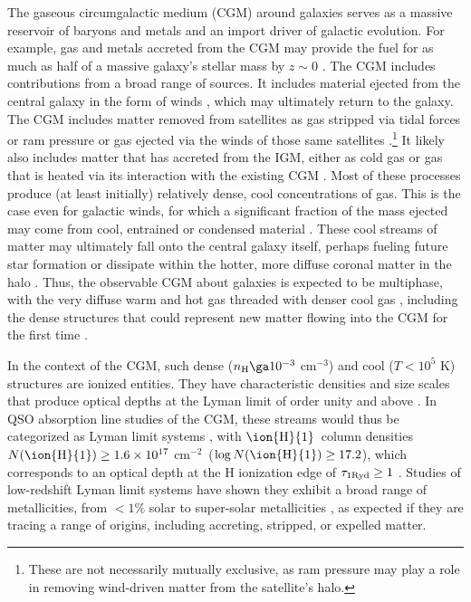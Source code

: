 \documentclass[12pt,preprint]{aastex6}
\newcommand{\HI}{\ensuremath{\mbox{\ion{H}{1}}}}
\newcommand{\logNHI}{\ensuremath{\log N(\mbox{\ion{H}{1}})}\relax}
\newcommand{\column}{cm$^{-2}$}
\newcommand{\percc}{cm$^{-3}$}
\begin{document}
The gaseous circumgalactic medium (CGM) around galaxies serves as a
massive reservoir of baryons and metals \citep{peeples2014, werk2014,
  keeney2017} and an import driver of galactic evolution. For example,
gas and metals accreted from the CGM may provide the fuel for as much
as half of a massive galaxy's stellar mass by $z\sim0$
\citep[e.g.,][]{oppenheimer2010, ford2014, angles-alcazar2016}. The
CGM includes contributions from a broad range of sources. It includes
material ejected from the central galaxy in the form of winds
\citep[e.g.,][]{weiner2009, tripp2011, shen2013, rubin2014, cafg2015,
  muratov2017}, which may ultimately return to the galaxy. The CGM
includes matter removed from satellites as gas stripped via tidal
forces or ram pressure \citep{grcevich2009, spekkens2014, emerick2016}
or gas ejected via the winds of those same satellites
\citep[e.g.,][]{angles-alcazar2016}.\footnote{These are not
  necessarily mutually exclusive, as ram pressure may play a role in
  removing wind-driven matter from the satellite's halo.} It likely
also includes matter that has accreted from the IGM, either as cold
gas or gas that is heated via its interaction with the existing CGM
\citep{keres2005, fumagalli2011, van-de-voort2011,cafg2011}.  Most of
these processes produce (at least initially) relatively dense, cool
concentrations of gas. This is the case even for galactic winds, for
which a significant fraction of the mass ejected may come from cool,
entrained or condensed material \citep[e.g.,][]{heckman1990,
  schwartz2004, rupke2005, rubin2014, kacprzak2014}. These cool
streams of matter may ultimately fall onto the central galaxy itself,
perhaps fueling future star formation \citep{keres2005,
  oppenheimer2010, ford2014} or dissipate within the hotter, more
diffuse coronal matter in the halo \citep[e.g.,][]{joung2012,
  voit2015}. Thus, the observable CGM about galaxies is expected to be
multiphase, with the very diffuse warm and hot gas
\citep[$10^5 \la T \la 10^7$ K;][]{tumlinson2011, prochaska2011,
  wakker2009, anderson2013} threaded with denser cool gas
\citep[$10^4 \la T \la 10^5$ K;][]{nielsen2013, kacprzak2013,
  werk2014, keeney2017}, including the dense structures that could
represent new matter flowing into the CGM for the first time
\citep{lehner2013, wotta2016, van-de-voort2012}.

In the context of the CGM, such dense ($n_{\rm H} \ga 10^{-3}$ \percc)
and cool ($T < 10^5$ K) structures are ionized entities. They have
characteristic densities and size scales that produce optical depths
at the Lyman limit of order unity and above \citep{schaye2001,
  fumagalli2011a, cafg2011, van-de-voort2012}. In QSO absorption line
studies of the CGM, these streams would thus be categorized as Lyman
limit systems \citep[LLSs; ][]{tytler1982,steidel1990}, with \HI\
column densities $N(\mbox{\HI}) \ge 1.6\times10^{17}$ \column\
($\logNHI \ge 17.2$), which corresponds to an optical depth at the H
ionization edge of $\tau_{\rm 1 Ryd} \ge 1$
\citep{spitzer1978}. Studies of low-redshift Lyman limit systems have
shown they exhibit a broad range of metallicities, from $<1\%$ solar
to super-solar metallicities \citep{lehner2013, wotta2016}, as
expected if they are tracing a range of origins, including accreting,
stripped, or expelled matter.
\end{document}
